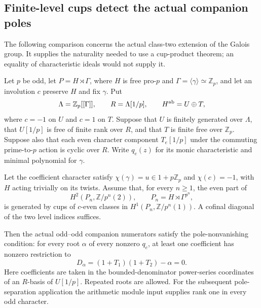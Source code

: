 \subsection{Finite-level cups detect the actual companion poles}

The following comparison concerns the actual class-two extension of
the Galois group. It supplies the naturality needed to use a cup-product
theorem; an equality of characteristic ideals would not supply it.

\begin{lemma}\label{lem:cup-pole-bridge}
Let $p$ be odd, let $P=H\rtimes\Gamma$, where $H$ is free pro-$p$
and $\Gamma=\langle\gamma\rangle\simeq\mathbb Z_p$, and let an
involution $c$ preserve $H$ and fix $\gamma$. Put
\[
 \Lambda=\mathbb Z_p[[\Gamma]],\qquad R=\Lambda[1/p],\qquad
 H^{\rm ab}=U\oplus T,
\]
where $c=-1$ on $U$ and $c=1$ on $T$. Suppose that $U$ is finitely
generated over $\Lambda$, that $U[1/p]$ is free of finite rank over
$R$, and that $T$ is finite free over $\mathbb Z_p$. Suppose also
that each even character component $T_e[1/p]$ under the commuting
prime-to-$p$ action is cyclic over $R$. Write $q_e(z)$ for its monic
characteristic and minimal polynomial for $\gamma$.

Let the coefficient character satisfy $\chi(\gamma)=u\in1+p\mathbb Z_p$
and $\chi(c)=-1$, with $H$ acting trivially on its twists. Assume that,
for every $n\geq1$, the even part of
\[
 H^2(P_n,\mathbb Z/p^n(2)),\qquad
 P_n=H\rtimes\Gamma^{p^n},
\]
is generated by cups of $c$-even classes in
$H^1(P_n,\mathbb Z/p^n(1))$. A cofinal diagonal of the two level
indices suffices.

Then the actual odd--odd companion numerators satisfy the
pole-nonvanishing condition: for every root $\alpha$ of every
nonzero $q_e$, at least one coefficient has nonzero restriction to
\[
 D_\alpha=(1+T_1)(1+T_2)-\alpha=0.
                                                               \tag{CE.1}
\]
Here coefficients are taken in the bounded-denominator power-series
coordinates of an $R$-basis of $U[1/p]$. Repeated roots are allowed.
For the subsequent pole-separation application the arithmetic module
input supplies rank one in every odd character.
\end{lemma}

